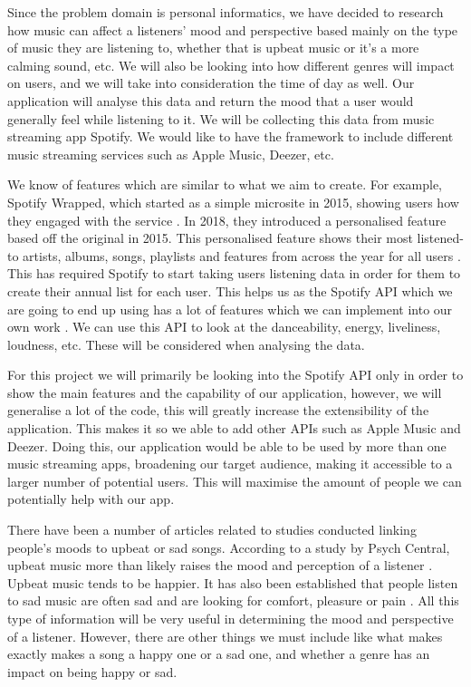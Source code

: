 \documentclass[10pt, notitlepage]{report}
\begin{document}
Since the problem domain is personal informatics, we have decided to research how music can affect a listeners' mood and perspective based mainly on the type of music they are listening to, whether that is upbeat music or it’s a more calming sound, etc. We will also be looking into how different genres will impact on users, and we will take into consideration the time of day as well. Our application will analyse this data and return the mood that a user would generally feel while listening to it. We will be collecting this data from music streaming app Spotify. We would like to have the framework to include different music streaming services such as Apple Music, Deezer, etc.

We know of features which are similar to what we aim to create. For example, Spotify Wrapped, which started as a simple microsite in 2015, showing users how they engaged with the service \cite{Swant}. In 2018, they introduced a personalised feature based off the original in 2015. This personalised feature shows their most listened-to artists, albums, songs, playlists and features from across the year for all users \cite{Somerville}. This has required Spotify to start taking users listening data in order for them to create their annual list for each user. This helps us as the Spotify API which we are going to end up using has a lot of features which we can implement into our own work \cite{WebAPI}. We can use this API to look at the danceability, energy, liveliness, loudness, etc. These will be considered when analysing the data.

For this project we will primarily be looking into the Spotify API only in order to show the main features and the capability of our application, however, we will generalise a lot of the code, this will greatly increase the extensibility of the application. This makes it so we able to add other APIs such as Apple Music and Deezer. Doing this, our application would be able to be used by more than one music streaming apps, broadening our target audience, making it accessible to a larger number of potential users. This will maximise the amount of people we can potentially help with our app.

There have been a number of articles related to studies conducted linking people’s moods to upbeat or sad songs. According to a study by Psych Central, upbeat music more than likely raises the mood and perception of a listener \cite{Nauert2018}. Upbeat music tends to be happier. It has also been established that people listen to sad music are often sad and are looking for comfort, pleasure or pain \cite{Eerola2016}. All this type of information will be very useful in determining the mood and perspective of a listener. However, there are other things we must include like what makes exactly makes a song a happy one or a sad one, and whether a genre has an impact on being happy or sad.
\end{document}
